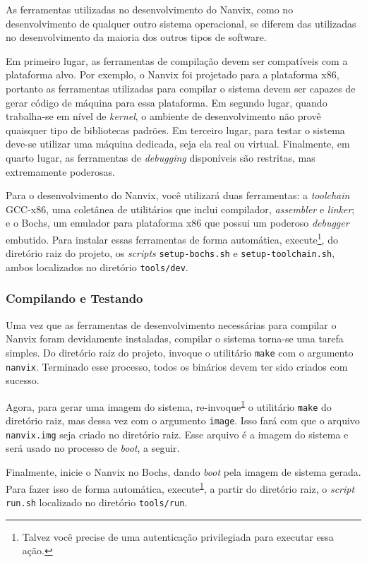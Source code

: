 \documentclass[11pt]{article}
\begin{document}
As ferramentas utilizadas no desenvolvimento do Nanvix, como no desenvolvimento de qualquer outro sistema operacional, se diferem das utilizadas no desenvolvimento da maioria dos outros tipos de software.

Em primeiro lugar, as ferramentas de compilação devem ser compatíveis com a plataforma alvo. Por exemplo, o Nanvix foi projetado para a plataforma x86, portanto as ferramentas utilizadas para compilar o sistema devem ser capazes de gerar código de máquina para essa plataforma. Em segundo lugar, quando trabalha-se em nível de \textit{kernel}, o ambiente de desenvolvimento não provê quaisquer tipo de bibliotecas padrões. Em terceiro lugar, para testar o sistema deve-se utilizar uma máquina dedicada, seja ela real ou virtual. Finalmente, em quarto lugar, as ferramentas de \textit{debugging} disponíveis são restritas, mas extremamente poderosas.

Para o desenvolvimento do Nanvix, você utilizará duas ferramentas: a \textit{toolchain} GCC-x86, uma coletânea de utilitários que inclui compilador, \textit{assembler} e \textit{linker}; e o Bochs, um emulador para plataforma x86 que possui um poderoso \textit{debugger} embutido. Para instalar essas ferramentas de forma automática, execute\footnote{\label{note1}Talvez você precise de uma autenticação privilegiada para executar essa ação.}, do diretório raiz do projeto, os \textit{scripts} \texttt{setup-bochs.sh} e \texttt{setup-toolchain.sh}, ambos localizados no diretório \texttt{tools/dev}.

\subsubsection*{Compilando e Testando}

Uma vez que as ferramentas de desenvolvimento necessárias para compilar o Nanvix foram devidamente instaladas, compilar o sistema torna-se uma tarefa simples. Do diretório raiz do projeto, invoque o utilitário \texttt{make} com o argumento \texttt{nanvix}. Terminado esse processo, todos os binários devem ter sido criados com sucesso.

Agora, para gerar uma imagem do sistema, re-invoque\textsuperscript{\ref{note1}} o utilitário \texttt{make} do diretório raiz, mas dessa vez com o argumento \texttt{image}. Isso fará com que o arquivo \texttt{nanvix.img} seja criado no diretório raiz. Esse arquivo é a imagem do sistema e será usado no processo de \textit{boot}, a seguir.

Finalmente, inicie o Nanvix no Bochs, dando \textit{boot} pela imagem de sistema gerada. Para fazer isso de forma automática, execute\textsuperscript{\ref{note1}}, a partir do diretório raiz, o \textit{script} \texttt{run.sh} localizado no diretório \texttt{tools/run}.
\end{document}
